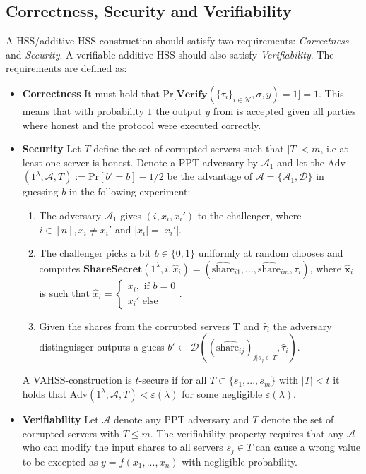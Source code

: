 \subsection*{Correctness, Security and Verifiability}
A HSS/additive-HSS construction should satisfy  two requirements: \textit{Correctness} and \textit{Security}. A verifiable additive HSS should also satisfy \textit{Verifiability}. The requirements are defined as:
\begin{itemize}
    \item \textbf{Correctness} It must hold that Pr$\Big[\textbf{Verify}(\{\tau_i\}_{i\in\mathcal{N}},\sigma,y)=1\Big]=1$. This means that with probability $1$ the output $y$ from  is accepted given all parties where honest and the protocol were executed correctly.
    \item \textbf{Security} Let $T$ define the set of corrupted servers such that $|T|<m$, i.e at least one server is honest.  Denote a PPT adversary by $\mathcal{A}_1$ and let the Adv$(1^\lambda,\mathcal{A},T):= \text{Pr}[b' = b]-1/2$ be the advantage of $\mathcal{A}=\{\mathcal{A}_1,\mathcal{D}\}$ in guessing $b$ in the following experiment:
    \begin{enumerate}
        \item The adversary $\mathcal{A}_1$ gives $(i,x_i,x_i')$ to the challenger, where $i\in[n], x_i\neq x_i'$ and $|x_i|=|x_i'|$.
        \item The challenger picks a bit $b\in\{0,1\}$ uniformly at random chooses and computes $\textbf{ShareSecret}(1^\lambda,i,\hat{x}_i) = (\hat{\text{share}}_{i1},...,\hat{\text{share}}_{im},\tau_i)$, where $\hat{\textbf{x}}_i$ is  such that $\hat{x}_i = \begin{cases}x_i, \text{ if } b=0 \\ x_i' \text{ else} \end{cases}$. 
        \item Given the shares from the corrupted servers T and $\hat{\tau}_i$ the adversary distinguisger outputs a guess $b'\xleftarrow[]{}\mathcal{D}((\hat{\text{share}_{ij}})_{j|s_j\in T},\hat{\tau}_i)$.
    \end{enumerate}
    A VAHSS-construction is $t$-secure if for all $T\subset \{s_1,...,s_m\}$ with $|T|<t$ it holds that Adv$(1^\lambda,\mathcal{A},T)<\varepsilon(\lambda)$ for some negligible $\varepsilon(\lambda)$.
 \item \textbf{Verifiability} Let $\mathcal{A}$ denote any PPT  adversary and $T$ denote the set of corrupted servers with $T\leq m$. The verifiability property requires that any $\mathcal{A}$ who can modify the input shares to all servers $s_j\in T$ can cause a wrong value to be excepted as $y=f(x_1,...,x_n)$ with negligible probability.   
\end{itemize}
